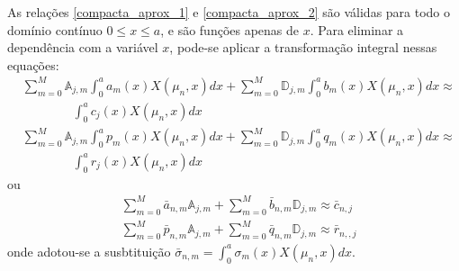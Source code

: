 As relações \eqref{compacta_aprox_1} e \eqref{compacta_aprox_2} são válidas para todo o domínio contínuo $0 \le x \le a$, e são funções apenas de $x$. Para eliminar a dependência com a variável $x$, pode-se aplicar a transformação integral nessas equações:
\begin{align}
& \sum_{m = 0}^M \mathbb{A}_{j,m}\int_0^a a_m(x)X(\mu_n, x)dx + \sum_{m = 0}^M \mathbb{D}_{j,m} \int_0^a b_m(x)X(\mu_n, x)dx \approx \nonumber \\ 
& \quad\quad\quad\quad\int_0^a c_{j}(x)X(\mu_n, x)dx \label{compacta_aprox_1_integr}
\end{align}
\begin{align}
& \sum_{m = 0}^M \mathbb{A}_{j,m}\int_0^a p_m(x)X(\mu_n, x)dx + \sum_{m = 0}^M \mathbb{D}_{j,m} \int_0^a q_m(x)X(\mu_n, x)dx \approx \nonumber \\ 
& \quad\quad\quad\quad\int_0^a r_{j}(x)X(\mu_n, x)dx  \label{compacta_aprox_2_integr}
\end{align}
ou
\begin{align}
& \sum_{m = 0}^M \bar{a}_{n,m} \mathbb{A}_{j,m} + \sum_{m = 0}^M \bar{b}_{n,m} \mathbb{D}_{j,m} \approx \bar{c}_{n,j} \label{sistema_para_coeficientes_1}
\\
& \sum_{m = 0}^M \bar{p}_{n,m} \mathbb{A}_{j,m} + \sum_{m = 0}^M \bar{q}_{n,m} \mathbb{D}_{j,m} \approx \bar{r}_{n,,j} \label{sistema_para_coeficientes_2}
\end{align}
onde adotou-se a susbtituição $\bar{\sigma}_{n,m} = \displaystyle \int_0^a \sigma_m(x)X(\mu_n, x)dx$.
\\

